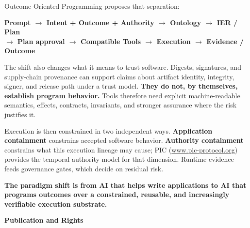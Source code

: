 \documentclass[10pt,oneside,openany]{book}
\begin{document}
{Outcome-Oriented Programming proposes that separation:

\begin{center}
\sffamily\bfseries\footnotesize
Prompt $\rightarrow$ Intent + Outcome + Authority $\rightarrow$ Ontology $\rightarrow$ IER / Plan\\
$\rightarrow$ Plan approval $\rightarrow$ Compatible Tools $\rightarrow$ Execution $\rightarrow$ Evidence / Outcome
\end{center}

The shift also changes what it means to trust software. Digests, signatures, and supply-chain provenance can support claims about artifact identity, integrity, signer, and release path under a trust model. \textbf{They do not, by themselves, establish program behavior.} Tools therefore need explicit machine-readable semantics, effects, contracts, invariants, and stronger assurance where the risk justifies it.

Execution is then constrained in two independent ways. \textbf{Application containment} constrains accepted software behavior. \textbf{Authority containment} constrains what this execution lineage may cause; PIC (\url{www.pic-protocol.org}) provides the temporal authority model for that dimension. Runtime evidence feeds governance gates, which decide on residual risk.

\textbf{The paradigm shift is from AI that helps write applications to AI that programs outcomes over a constrained, reusable, and increasingly verifiable execution substrate.}
}

\vfill
\clearpage
\pagestyle{fancy}

\thispagestyle{empty}
\vspace*{0.02in}
{\sffamily\bfseries\Large Publication and Rights\par}
\vspace{0.08in}
\end{document}
